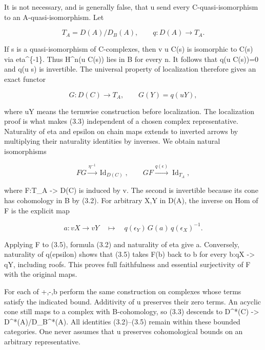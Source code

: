 It is not necessary,\allowbreak{} and is generally false,\allowbreak{} that u send every C-quasi-isomorphism to an A-quasi-isomorphism. Let

\[
 T_A=D(A)/D_B(A),\qquad q:D(A)\longrightarrow T_A.
\]

If s is a quasi-isomorphism of C-complexes,\allowbreak{} then v u C(s)\allowbreak{} is isomorphic to C(s)\allowbreak{} via eta\^{}\{-1\}. Thus H\^{}n(u C(s)\allowbreak{})\allowbreak{} lies in B for every n. It follows that q(u C(s)\allowbreak{})\allowbreak{}\allowbreak{}=0 and q(u s)\allowbreak{} is invertible. The universal property of localization therefore gives an exact functor

\[
 G:D(C)\longrightarrow T_A,\qquad G(Y)=q(uY),              \tag{3.3}
\]

where uY means the termwise construction before localization. The localization proof is what makes (3.3)\allowbreak{} independent of a chosen complex representative. Naturality of eta and epsilon on chain maps extends to inverted arrows by multiplying their naturality identities by inverses. We obtain natural isomorphisms

\[
 F G\xrightarrow{\eta^{-1}}\operatorname{Id}_{D(C)},\qquad
 G F\xrightarrow{q(\epsilon)}\operatorname{Id}_{T_A},      \tag{3.4}
\]

where F:\allowbreak{}T\_\allowbreak{}A \allowbreak{}-> D(C)\allowbreak{} is induced by v. The second is invertible because its cone has cohomology in B by (3.2)\allowbreak{}. For arbitrary X,\allowbreak{}Y in D(A)\allowbreak{},\allowbreak{} the inverse on Hom of F is the explicit map

\[
 a:vX\longrightarrow vY
 \quad\longmapsto\quad
 q(\epsilon_Y)\,G(a)\,q(\epsilon_X)^{-1}.                 \tag{3.5}
\]

Applying F to (3.5)\allowbreak{},\allowbreak{} formula (3.2)\allowbreak{} and naturality of eta give a. Conversely,\allowbreak{} naturality of q(epsilon)\allowbreak{} shows that (3.5)\allowbreak{} takes F(b)\allowbreak{} back to b for every b:\allowbreak{}qX \allowbreak{}-> qY,\allowbreak{} including roofs. This proves full faithfulness and essential surjectivity of F with the original maps.

For each of \allowbreak{}+,\allowbreak{}-,\allowbreak{}b perform the same construction on complexes whose terms satisfy the indicated bound. Additivity of u preserves their zero terms. An acyclic cone still maps to a complex with B-cohomology,\allowbreak{} so (3.3)\allowbreak{} descends to D\textasciicircum{}*(C)\allowbreak{} \allowbreak{}-> D\textasciicircum{}*(A)\allowbreak{}/\allowbreak{}D\_\allowbreak{}B\textasciicircum{}*(A)\allowbreak{}. All identities (3.2)\allowbreak{}–\allowbreak{}(3.5)\allowbreak{} remain within these bounded categories. One never assumes that u preserves cohomological bounds on an arbitrary representative.

